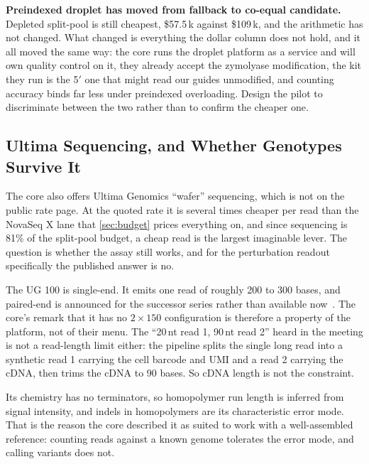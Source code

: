 \begin{keybox}
\textbf{Preindexed droplet has moved from fallback to co-equal candidate.}
Depleted split-pool is still cheapest, \$57.5\,k against \$109\,k, and the
arithmetic has not changed. What changed is everything the dollar column does
not hold, and it all moved the same way: the core runs the droplet platform as a
service and will own quality control on it, they already accept the zymolyase
modification, the kit they run is the 5$'$ one that might read our guides
unmodified, and counting accuracy binds far less under preindexed overloading.
Design the pilot to discriminate between the two rather than to confirm the
cheaper one.
\end{keybox}

\subsection{Ultima Sequencing, and Whether Genotypes Survive It}
\label{sec:ultima}

The core also offers Ultima Genomics ``wafer'' sequencing, which is not on the
public rate page. At the quoted rate it is several times cheaper per read than
the NovaSeq X lane that \cref{sec:budget} prices everything on, and since
sequencing is 81\% of the split-pool budget, a cheap read is the largest
imaginable lever. The question is whether the assay still works, and for the
perturbation readout specifically the published answer is no.

 The UG 100 is single-end. It emits one
read of roughly 200 to 300 bases, and paired-end is announced for the successor
series rather than available now~\citep{simmonsMostlyNaturalSequencing2023}. The
core's remark that it has no $2\times150$ configuration is therefore a property
of the platform, not of their menu. The ``20\,nt read 1, 90\,nt read 2'' heard in
the meeting is not a read-length limit either: the pipeline splits the single
long read into a synthetic read 1 carrying the cell barcode and UMI and a read 2
carrying the cDNA, then trims the cDNA to 90 bases. So cDNA length is not the
constraint.

Its chemistry has no terminators, so homopolymer run length is inferred from
signal intensity, and indels in homopolymers are its characteristic error mode.
That is the reason the core described it as suited to work with a well-assembled
reference: counting reads against a known genome tolerates the error mode, and
calling variants does not.

